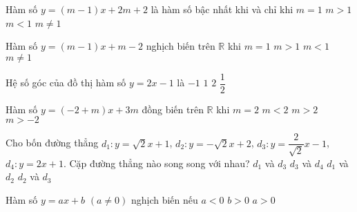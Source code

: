 \begin{ex}%
	Hàm số $y=(m-1)x+2m+2$ là hàm số bậc nhất khi và chỉ khi
	\choice
	{$m=1$}
	{$m>1$}
	{$m<1$}
	{\True $m\neq 1$}
\end{ex}

\begin{ex}%
	Hàm số $y=(m-1)x+m-2$ nghịch biến trên $\mathbb R$ khi
	\choice
	{$m=1$}
	{$m>1$}
	{\True $m<1$}
	{$m\neq 1$}
\end{ex}

\begin{ex}%
	Hệ số góc của đồ thị hàm số $y=2x-1$ là
	\choice
	{$-1$}
	{$1$}
	{\True $2$}
	{$\dfrac{1}{2}$}
\end{ex}

\begin{ex}%
	Hàm số $y=(-2+m)x+3m$ đồng biến trên $\mathbb R$ khi
	\choice
	{$m=2$}
	{$m<2$}
	{\True $m>2$}
	{$m>-2$}
\end{ex}

\begin{ex}%
	Cho bốn đường thẳng $d_{1}:y=\sqrt{2}x+1$, $d_{2}:y=-\sqrt{2}x+2$, $d_{3}:y=\dfrac{2}{\sqrt{2}}x-1$, $d_{4}:y=2x+1$. Cặp đường thẳng nào song song với nhau?
	\choice
	{\True $d_{1}$ và $d_{3}$}
	{$d_{3}$ và $d_{4}$}
	{$d_{1}$ và $d_{2}$}
	{$d_{2}$ và $d_{3}$}
\end{ex}

\begin{ex}%
	Hàm số $ y=ax+b \,\, (a \ne 0)$ nghịch biến nếu
	{\True $a<0  $}
	{$b>0 $}
	{$a>0 $}
\end{ex}

